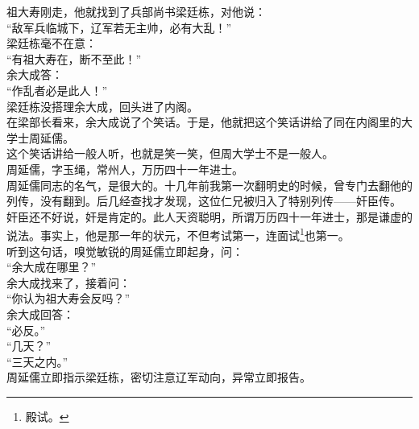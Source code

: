 \begin{multicols}{\theparacolNo}
祖大寿刚走，他就找到了兵部尚书梁廷栋，对他说：\\

“敌军兵临城下，辽军若无主帅，必有大乱！”\\

梁廷栋毫不在意：\\

“有祖大寿在，断不至此！”\\

余大成答：\\

“作乱者必是此人！”\\

梁廷栋没搭理余大成，回头进了内阁。\\

在梁部长看来，余大成说了个笑话。于是，他就把这个笑话讲给了同在内阁里的大学士周延儒。\\

这个笑话讲给一般人听，也就是笑一笑，但周大学士不是一般人。\\

周延儒，字玉绳，常州人，万历四十一年进士。\\

周延儒同志的名气，是很大的。十几年前我第一次翻明史的时候，曾专门去翻他的列传，没有翻到。后几经查找才发现，这位仁兄被归入了特别列传——奸臣传。\\

奸臣还不好说，奸是肯定的。此人天资聪明，所谓万历四十一年进士，那是谦虚的说法。事实上，他是那一年的状元，不但考试第一，连面试\footnote{殿试。}也第一。\\

听到这句话，嗅觉敏锐的周延儒立即起身，问：\\

“余大成在哪里？”\\

余大成找来了，接着问：\\

“你认为祖大寿会反吗？”\\

余大成回答：\\

“必反。”\\

“几天？”\\

“三天之内。”\\

周延儒立即指示梁廷栋，密切注意辽军动向，异常立即报告。\\


\end{multicols}
